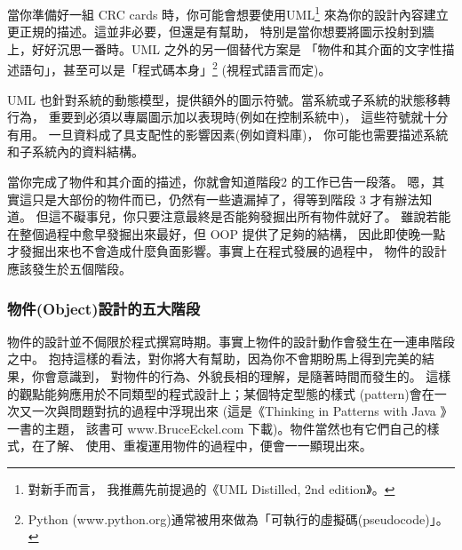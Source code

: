 當你準備好一組 CRC cards 時，你可能會想要使用UML\footnote{對新手而言，
我推薦先前提過的《UML Distilled, 2nd edition》。}
來為你的設計內容建立更正規的描述。這並非必要，但還是有幫助，
特別是當你想要將圖示投射到牆上，好好沉思一番時。UML 之外的另一個替代方案是
「物件和其介面的文字性描述語句」，甚至可以是「程式碼本身」\footnote{Python
(www.python.org)通常被用來做為「可執行的虛擬碼(pseudocode)」。}
(視程式語言而定)。

UML 也針對系統的動態模型，提供額外的圖示符號。當系統或子系統的狀態移轉行為，
重要到必須以專屬圖示加以表現時(例如在控制系統中)， 這些符號就十分有用。
一旦資料成了具支配性的影響因素(例如資料庫)，
你可能也需要描述系統和子系統內的資料結構。

當你完成了物件和其介面的描述，你就會知道階段2 的工作已告一段落。
嗯，其實這只是大部份的物件而已，仍然有一些遺漏掉了，得等到階段 3 才有辦法知道。
但這不礙事兒，你只要注意最終是否能夠發掘出所有物件就好了。
雖說若能在整個過程中愈早發掘出來最好，但 OOP 提供了足夠的結構，
因此即使晚一點才發掘出來也不會造成什麼負面影響。事實上在程式發展的過程中，
物件的設計應該發生於五個階段。

\subsubsection{物件(Object)設計的五大階段}
物件的設計並不侷限於程式撰寫時期。事實上物件的設計動作會發生在一連串階段之中。
抱持這樣的看法，對你將大有幫助，因為你不會期盼馬上得到完美的結果，你會意識到，
對物件的行為、外貌長相的理解，是隨著時間而發生的。
這樣的觀點能夠應用於不同類型的程式設計上；某個特定型態的樣式
(pattern)會在一次又一次與問題對抗的過程中浮現出來
(這是《Thinking in Patterns with Java 》一書的主題， 該書可
www.BruceEckel.com 下載)。物件當然也有它們自己的樣式，在了解、
使用、重複運用物件的過程中，便會一一顯現出來。

